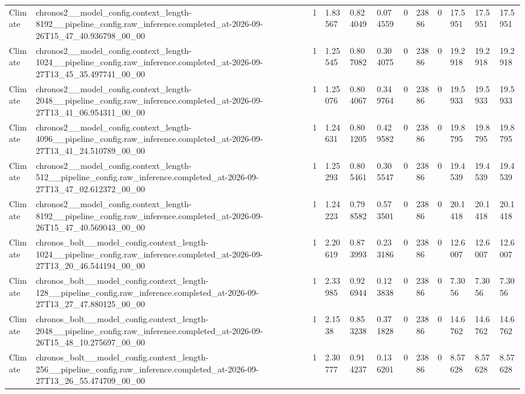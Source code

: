 \begin{tabular}{llllllllllll}
Climate & chronos2\_\_model\_config.context\_length-8192\_\_pipeline\_config.raw\_inference.completed\_at-2026-09-26T15\_47\_40.936798\_00\_00 & 1 & 1.83567 & 0.824049 & 0.074559 & 0 & 23886 & 0 & 17.5951 & 17.5951 & 17.5951 \\
Climate & chronos2\_\_model\_config.context\_length-1024\_\_pipeline\_config.raw\_inference.completed\_at-2026-09-27T13\_45\_35.497741\_00\_00 & 1 & 1.25545 & 0.807082 & 0.304075 & 0 & 23886 & 0 & 19.2918 & 19.2918 & 19.2918 \\
Climate & chronos2\_\_model\_config.context\_length-2048\_\_pipeline\_config.raw\_inference.completed\_at-2026-09-27T13\_41\_06.954311\_00\_00 & 1 & 1.25076 & 0.804067 & 0.349764 & 0 & 23886 & 0 & 19.5933 & 19.5933 & 19.5933 \\
Climate & chronos2\_\_model\_config.context\_length-4096\_\_pipeline\_config.raw\_inference.completed\_at-2026-09-27T13\_41\_24.510789\_00\_00 & 1 & 1.24631 & 0.801205 & 0.429582 & 0 & 23886 & 0 & 19.8795 & 19.8795 & 19.8795 \\
Climate & chronos2\_\_model\_config.context\_length-512\_\_pipeline\_config.raw\_inference.completed\_at-2026-09-27T13\_47\_02.612372\_00\_00 & 1 & 1.25293 & 0.805461 & 0.305547 & 0 & 23886 & 0 & 19.4539 & 19.4539 & 19.4539 \\
Climate & chronos2\_\_model\_config.context\_length-8192\_\_pipeline\_config.raw\_inference.completed\_at-2026-09-26T15\_47\_40.569043\_00\_00 & 1 & 1.24223 & 0.798582 & 0.573501 & 0 & 23886 & 0 & 20.1418 & 20.1418 & 20.1418 \\
Climate & chronos\_bolt\_\_model\_config.context\_length-1024\_\_pipeline\_config.raw\_inference.completed\_at-2026-09-27T13\_20\_46.544194\_00\_00 & 1 & 2.20619 & 0.873993 & 0.233186 & 0 & 23886 & 0 & 12.6007 & 12.6007 & 12.6007 \\
Climate & chronos\_bolt\_\_model\_config.context\_length-128\_\_pipeline\_config.raw\_inference.completed\_at-2026-09-27T13\_27\_47.880125\_00\_00 & 1 & 2.33985 & 0.926944 & 0.123838 & 0 & 23886 & 0 & 7.3056 & 7.3056 & 7.3056 \\
Climate & chronos\_bolt\_\_model\_config.context\_length-2048\_\_pipeline\_config.raw\_inference.completed\_at-2026-09-26T15\_48\_10.275697\_00\_00 & 1 & 2.1538 & 0.853238 & 0.371828 & 0 & 23886 & 0 & 14.6762 & 14.6762 & 14.6762 \\
Climate & chronos\_bolt\_\_model\_config.context\_length-256\_\_pipeline\_config.raw\_inference.completed\_at-2026-09-27T13\_26\_55.474709\_00\_00 & 1 & 2.30777 & 0.914237 & 0.136201 & 0 & 23886 & 0 & 8.57628 & 8.57628 & 8.57628 \\

\end{tabular}
